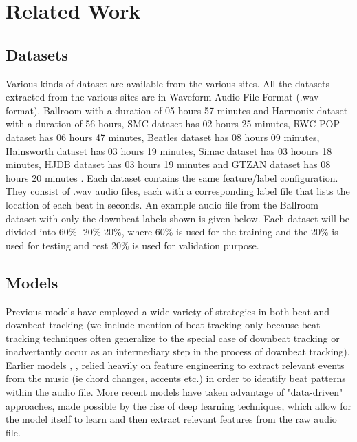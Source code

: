 \documentclass[conference]{IEEEtran}
\begin{document}
\section{Related Work}
\subsection{Datasets}
Various kinds of dataset are available from the various sites. All the datasets 
extracted from the various sites are in Waveform Audio File Format (.wav format). 
Ballroom with a duration of 05 hours 57 minutes and Harmonix dataset with a 
duration of 56 hours, SMC dataset has 02 hours 25 minutes, RWC-POP dataset 
has 06 hours 47 minutes, Beatles dataset has 08 hours 09 minutes, Hainsworth 
dataset has 03 hours 19 minutes, Simac dataset has 03 hoours 18 minutes, HJDB 
dataset has 03 hours 19 minutes and GTZAN dataset has 08 hours 20 minutes . 
Each dataset contains the same feature/label configuration. They consist of .wav 
audio files, each with a corresponding label file that lists the location of each
beat in seconds. An example audio file from the Ballroom dataset with only the 
downbeat labels shown is given below. Each dataset will be divided into 60\%-
20\%-20\%, where 60\% is used for the training and the 20\% is used for testing 
and rest 20\% is used for validation purpose.

\subsection{Models}
Previous models have employed a wide variety of strategies in both beat and 
downbeat tracking (we include mention of beat tracking only because beat
tracking techniques often generalize to the special case of downbeat tracking
or inadvertantly occur as an intermediary step in the process of downbeat
tracking). Earlier models \cite{b2}, \cite{b3}, \cite{b4} relied heavily on feature engineering to extract
relevant events from the music (ie chord changes, accents etc.) in order to identify
beat patterns within the audio file. More recent models have taken advantage of 
"data-driven" approaches, made possible by the rise of deep learning techniques, which allow
for the model itself to learn and then extract relevant features from the raw audio file.
\end{document}
